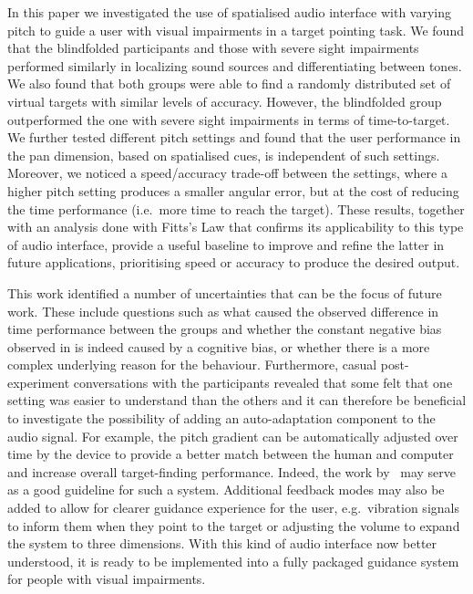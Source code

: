 \documentclass[acmsmall]{acmart}
\begin{document}
In this paper we investigated the use of spatialised audio interface with varying pitch to guide a user with visual impairments in a target pointing task.
We found that the blindfolded participants and those with severe sight impairments performed similarly in localizing sound sources and differentiating between tones. 
We also found that both groups were able to find a randomly distributed set of virtual targets with similar levels of accuracy.
However, the blindfolded group outperformed the one with severe sight impairments in terms of time-to-target. 
We further tested different pitch settings and found that the user performance in the pan dimension, based on spatialised cues, is independent of such settings.
Moreover, we noticed a speed/accuracy trade-off between the settings, where a higher pitch setting produces a smaller angular error, but at the cost of reducing the time performance (i.e.\ more time to reach the target). 
These results, together with an analysis done with Fitts's Law that confirms its applicability to this type of audio interface, provide a useful baseline to improve and refine the latter in future applications, prioritising speed or accuracy to produce the desired output.

This work identified a number of uncertainties that can be the focus of future work.
These include questions such as what caused the observed difference in time performance between the groups and whether the constant negative bias observed in  is indeed caused by a cognitive bias, or whether there is a more complex underlying reason for the behaviour.
Furthermore, casual post-experiment conversations with the participants revealed that some felt that one setting was easier to understand than the others and it can therefore be beneficial to investigate the possibility of adding an auto-adaptation component to the audio signal.
For example, the pitch gradient can be automatically adjusted over time by the device to provide a better match between the human and computer and increase overall target-finding performance.
Indeed, the work by~\citet{gallina2015progressive} may serve as a good guideline for such a system.
Additional feedback modes may also be added to allow for clearer guidance experience for the user, e.g.\ vibration signals to inform them when they point to the target or adjusting the volume to expand the system to three dimensions.
With this kind of audio interface now better understood, it is ready to be implemented into a fully packaged guidance system for people with visual impairments.



\end{document}
